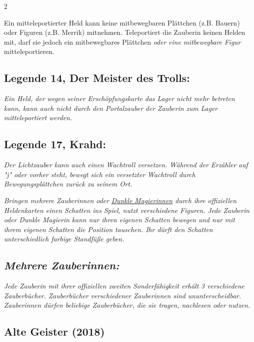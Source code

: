 \documentclass[10pt, a4paper, oneside]{book}
\newcommand{\fan}[1]{\textit{#1}}
\begin{document}
\begin{multicols*}{2}
\begin{bgcolor}
Ein mitteleportierter Held kann keine mitbewegbaren Plättchen (z.B. Bauern) oder Figuren (z.B. Merrik) mitnehmen. Teleportiert die Zauberin keinen Helden mit, darf sie jedoch ein mitbewegbares Plättchen \fan{oder eine mitbewegbare Figur} mitteleportieren.\supercite{41284} 




\subsection{Legende 14, Der Meister des Trolls:}

\fan{Ein Held, der wegen seiner Erschöpfungskarte das Lager nicht mehr betreten kann, kann auch nicht durch den Portalzauber der Zauberin zum Lager mitteleportiert werden.}







\subsection{Legende 17, Krahd:}

\fan{Der Lichtzauber kann auch einen Wachtroll versetzen. Während der Erzähler auf "j" oder vorher steht, bewegt sich ein versetzter Wachtroll durch Bewegungsplättchen zurück zu seinem Ort.}

\fan{Bringen mehrere Zauberinnen oder \hyperref[dunkle-magierin]{Dunkle Magierinnen} durch ihre offiziellen Heldenkarten einen Schatten ins Spiel, nutzt verschiedene Figuren. Jede Zauberin oder Dunkle Magierin kann nur ihren eigenen Schatten bewegen und nur mit ihrem eigenen Schatten die Position tauschen. Ihr dürft den Schatten unterschiedlich farbige Standfüße geben.}



\subsection{\fan{Mehrere Zauberinnen:}}
\fan{Jede Zauberin mit ihrer offiziellen zweiten Sonderfähigkeit erhält 3 verschiedene Zauberbücher. Zauberbücher verschiedener Zauberinnen sind ununterscheidbar. Zauberinnen dürfen beliebige Zauberbücher, die sie tragen, nachlesen oder nutzen.}

\end{bgcolor}




\begin{bgcolor}[color-ag]
\section{Alte Geister (2018)}


\end{bgcolor}
\end{multicols*}
\end{document}
